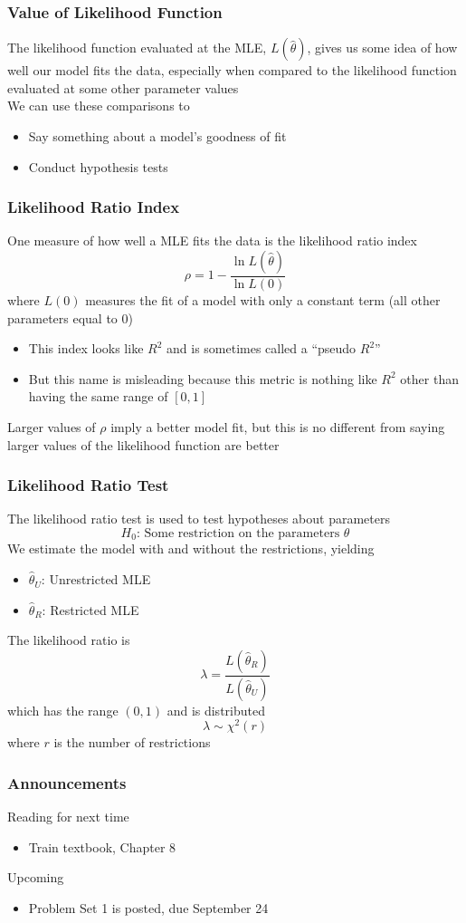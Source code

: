 \documentclass{beamer}
\begin{document}
\begin{frame}\frametitle{Value of Likelihood Function}
    The likelihood function evaluated at the MLE, $L(\hat{\theta})$, gives us some idea of how well our model fits the data, especially when compared to the likelihood function evaluated at some other parameter values \\
    \vspace{3ex}
    We can use these comparisons to 
    \begin{itemize}
        \item Say something about a model's goodness of fit
        \item Conduct hypothesis tests
    \end{itemize}
\end{frame}

\begin{frame}\frametitle{Likelihood Ratio Index}
    One measure of how well a MLE fits the data is the likelihood ratio index
    $$\rho = 1 - \frac{\ln L(\hat{\theta})}{\ln L(0)}$$
    where $L(0)$ measures the fit of a model with only a constant term (all other parameters equal to 0)
    \begin{itemize}
        \item This index looks like $R^2$ and is sometimes called a ``pseudo $R^2$''
        \item But this name is misleading because this metric is nothing like $R^2$ other than having the same range of $[0, 1]$
    \end{itemize}
    \vspace{2ex}
    Larger values of $\rho$ imply a better model fit, but this is no different from saying larger values of the likelihood function are better
\end{frame}

\begin{frame}\frametitle{Likelihood Ratio Test}
    The likelihood ratio test is used to test hypotheses about parameters
    $$H_0 \text{: Some restriction on the parameters } \theta$$
    We estimate the model with and without the restrictions, yielding
    \begin{itemize}
        \item $\hat{\theta}_U$: Unrestricted MLE
        \item $\hat{\theta}_R$: Restricted MLE
    \end{itemize}
    \vspace{2ex}
    The likelihood ratio is
    $$\lambda = \frac{L(\hat{\theta}_R)}{L(\hat{\theta}_U)}$$
    which has the range $(0, 1)$ and is distributed
    $$\lambda \sim \chi^2(r)$$
    where $r$ is the number of restrictions
\end{frame}

\begin{frame}\frametitle{Announcements}
    Reading for next time
    \begin{itemize}
        \item Train textbook, Chapter 8
    \end{itemize}
    \vspace{3ex}
    Upcoming
    \begin{itemize}
        \item Problem Set 1 is posted, due September 24
    \end{itemize}
\end{frame}
\end{document}
